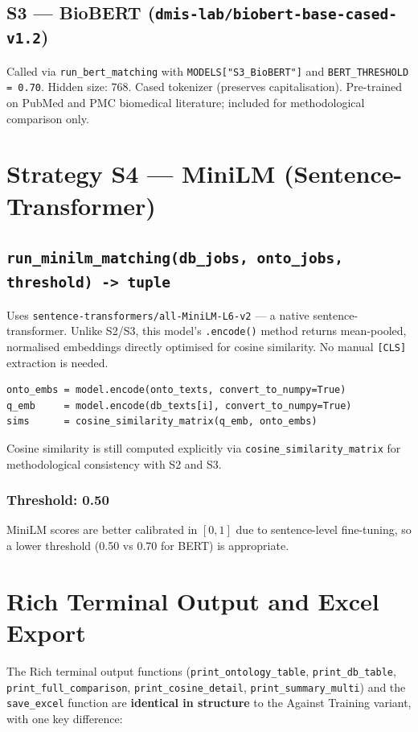 ﻿\documentclass[12pt,a4paper]{article}
\begin{document}
\subsection{S3 --- BioBERT (\texttt{dmis-lab/biobert-base-cased-v1.2})}
Called via \texttt{run\_bert\_matching} with \texttt{MODELS["S3\_BioBERT"]} and \texttt{BERT\_THRESHOLD = 0.70}. Hidden size: 768. Cased tokenizer (preserves capitalisation). Pre-trained on PubMed and PMC biomedical literature; included for methodological comparison only.

\clearpage
\section{Strategy S4 --- MiniLM (Sentence-Transformer)}

\subsection{\texttt{run\_minilm\_matching(db\_jobs, onto\_jobs, threshold) -> tuple}}

Uses \texttt{sentence-transformers/all-MiniLM-L6-v2} --- a native sentence-transformer. Unlike S2/S3, this model's \texttt{.encode()} method returns mean-pooled, normalised embeddings directly optimised for cosine similarity. No manual \texttt{[CLS]} extraction is needed.

\begin{lstlisting}
onto_embs = model.encode(onto_texts, convert_to_numpy=True)
q_emb     = model.encode(db_texts[i], convert_to_numpy=True)
sims      = cosine_similarity_matrix(q_emb, onto_embs)
\end{lstlisting}

Cosine similarity is still computed explicitly via \texttt{cosine\_similarity\_matrix} for methodological consistency with S2 and S3.

\subsubsection*{Threshold: 0.50}
MiniLM scores are better calibrated in $[0,1]$ due to sentence-level fine-tuning, so a lower threshold (0.50 vs 0.70 for BERT) is appropriate.

\clearpage
\section{Rich Terminal Output and Excel Export}

The Rich terminal output functions (\texttt{print\_ontology\_table}, \texttt{print\_db\_table}, \texttt{print\_full\_comparison}, \texttt{print\_cosine\_detail}, \texttt{print\_summary\_multi}) and the \texttt{save\_excel} function are \textbf{identical in structure} to the Against Training variant, with one key difference:
\end{document}
